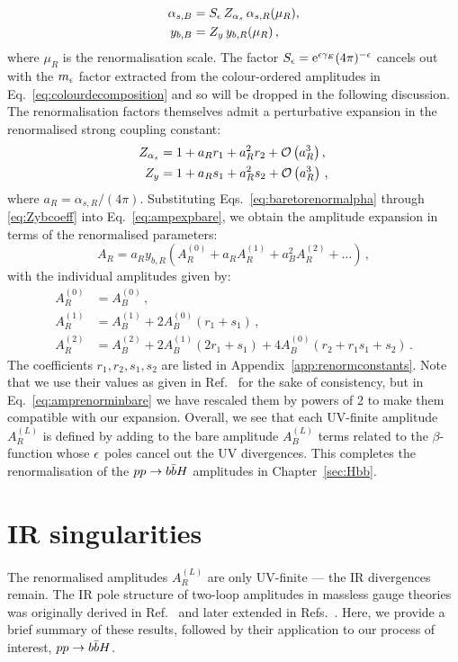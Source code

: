 \documentclass[main.tex]{subfiles}
\begin{document}
\begin{align}
    \alpha_{s,B} &= S_\epsilon\, Z_{\alpha_s} \, \alpha_{s,R}(\mu_R), \label{eq:baretorenormalpha} \\
    y_{b,B} &= Z_y \, y_{b,R}(\mu_R) \label{eq:baretorenormyb} \,,
\end{align}
where $\mu_R$ is the renormalisation scale. The factor $S_\epsilon = \mathrm{e}^{\epsilon \gamma_E} (4\pi)^{-\epsilon}$ cancels out with the $m_\epsilon$ factor extracted from the colour-ordered amplitudes in Eq.~\ref{eq:colourdecomposition} and so will be dropped in the following discussion. The renormalisation factors themselves admit a perturbative expansion in the renormalised strong coupling constant:
\begin{align}
    Z_{\alpha_s} &= 1 + a_R r_1 + a_R^2 r_2 + \mathcal{O}\left(a_R^3\right),  \label{eq:Zalphacoeff} \\
    Z_y &= 1 + a_R s_1 + a_R^2 s_2 + \mathcal{O}\left(a_R^3\right) \label{eq:Zybcoeff}\,,
\end{align}
where $a_R = \alpha_{s,R}/(4\pi)$. Substituting Eqs.~\ref{eq:baretorenormalpha} through \ref{eq:Zybcoeff} into Eq.~\ref{eq:ampexpbare}, we obtain the amplitude expansion in terms of the renormalised parameters:
\begin{equation} \label{eq:ampexprenorm}
    A_R = a_R y_{b,R} \left(A_R^{(0)} + a_R A_R^{(1)} + a_B^2 A_R^{(2)} + \ldots \right)\,,
\end{equation}
with the individual amplitudes given by:
\begin{align}
    A_R^{(0)} &= A_B^{(0)} \,,\nonumber \\ 
    A_R^{(1)} &= A_B^{(1)} + 2 A_B^{(0)}(r_1 + s_1) \,, \label{eq:amprenorminbare}\\ 
    A_R^{(2)} &= A_B^{(2)} + 2 A_B^{(1)}(2r_1 + s_1) + 4A_B^{(0)} (r_2 + r_1 s_1 + s_2)\,. \nonumber
\end{align}
The coefficients $r_1, r_2, s_1, s_2$ are listed in Appendix~\ref{app:renormconstants}. Note that we use their values as given in Ref.~\cite{Mondini:2019vub} for the sake of consistency, but in Eq.~\ref{eq:amprenorminbare} we have rescaled them by powers of 2 to make them compatible with our expansion. Overall, we see that each UV-finite amplitude $A_R^{(L)}$ is defined by adding to the bare amplitude $A_B^{(L)}$ terms related to the $\beta$-function whose $\epsilon$ poles cancel out the UV divergences. This completes the renormalisation of the $pp \rightarrow b\bar{b}H$ amplitudes in Chapter~\ref{sec:Hbb}.
\section{IR singularities}
The renormalised amplitudes $A_R^{(L)}$ are only UV-finite --- the IR divergences remain. The IR pole structure of two-loop amplitudes in massless gauge theories was originally derived in Ref.~\cite{Catani:1998bh} and later extended in  Refs.~\cite{Becher:2009cu, Becher:2009qa, Gardi:2009qi}. Here, we provide a brief summary of these results, followed by their application to our process of interest, $pp \rightarrow b\bar{b}H$.
\end{document}
